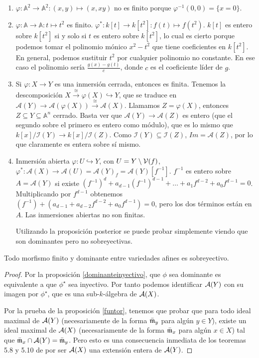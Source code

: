 \documentclass[ACGA.tex]{subfiles}
\begin{document}
\begin{ejs}
\begin{enumerate}
\item $\varphi:\mathbb{A}^2\to\mathbb{A}^2:(x,y)\mapsto(x,xy)$ no es finito porque $\varphi^{-1}(0,0)=\{x=0\}$.
\item $\varphi:\mathbb{A}\to\mathbb{A}:t\mapsto t^2$ es finito. $\varphi^*:k[t]\to k[t^2]:f(t)\mapsto f(t^2)$. $k[t]$ es entero sobre $k[t^2]$ si y solo si $t$ es entero sobre $k[t^2]$, lo cual es cierto porque podemos tomar el polinomio mónico $x^2-t^2$ que tiene coeficientes en $k[t^2]$. En general, podemos sustituir $t^2$ por cualquier polinomio no constante. En ese caso el polinomio sería $\frac{g(x)-g(t)}{c}$, donde $c$ es el coeficiente líder de $g$. 
\item Si $\varphi:X\to Y$ es una inmersión cerrada, entonces es finita. Tenemos la descomposición $X\overset{\cong}{\to}\varphi(X)\hookrightarrow Y$, que se traduce en $\mathcal{A}(Y)\to\mathcal{A}(\varphi(X))\overset{\cong}{\to}\mathcal{A}(X)$. Llamamos $Z=\varphi(X)$, entonces $Z\subseteq Y\subseteq\mathbb{A}^n$ cerrado. Basta ver que $\mathcal{A}(Y)\to\mathcal{A}(Z)$ es entero (que el segundo sobre el primero es entero como módulo), que es lo mismo que $k[x]/\mathcal{I}(Y)\to k[x]/\mathcal{I}(Z)$. Como $\mathcal{I}(Y)\subseteq\mathcal{I}(Z)$, $Im =\mathcal{A}(Z)$, por lo que claramente es entera sobre sí mismo.
\item Inmersión abierta $\varphi:U\hookrightarrow Y$, con $U=Y\setminus\mathcal{V}(f)$, $\varphi^*:\mathcal{A}(X)\to\mathcal{A}(U)=\mathcal{A}(Y)_f=\mathcal{A}(Y)[f^{-1}]$. $f^{-1}$ es entero sobre $A=\mathcal{A}(Y)$ si existe $(f^{-1})^d +a_{d-1}(f^{-1})^{d-1}+\dots+a_1f^{d-2} + a_0f^{d-1}=0$. Multiplicando por $f^{d-1}$ obtenemos $(f^{-1})+(a_{d-1}+a_{d-2}f^{d-2}+a_0f^{d-1})=0$, pero los dos términos están en $A$. Las inmersiones abiertas no son finitas.

Utilizando la proposición posterior se puede probar simplemente viendo que son dominantes pero no sobreyectivas.
\end{enumerate}
\end{ejs}
\begin{prop}
 Todo morfismo finito y dominante entre variedades afines es sobreyectivo.
\end{prop}

\begin{proof}

 Por la proposición \ref{dominanteinyectivo}, que $\phi$ sea dominante es equivalente a que $\phi^\star$ sea inyectivo. Por tanto podemos identificar $\mathcal{A}(Y)$ con su imagen por $\phi^\star$, que es una sub-$k$-álgebra de $\mathcal{A}(X)$. 

 Por la prueba de la proposición \ref{funtor}, tenemos que probar que para todo ideal maximal de $\mathcal{A}(Y)$ (necesariamente de la forma $\bar{{\mathfrak{m}}}_y$ para algún $y\in Y$), existe un ideal maximal de $\mathcal{A}(X)$ (necesariamente de la forma $\bar{{\mathfrak{m}}}_x$ para algún $x\in X$) tal que $\bar{{\mathfrak{m}}}_x\cap \mathcal{A}(Y)=\bar{{\mathfrak{m}}}_y$. Pero esto es una consecuencia inmediata de los teoremas 5.8 y 5.10 de \cite{am} por ser $\mathcal{A}(X)$ una extensión entera de $\mathcal{A}(Y)$. 
\end{proof}
\end{document}
